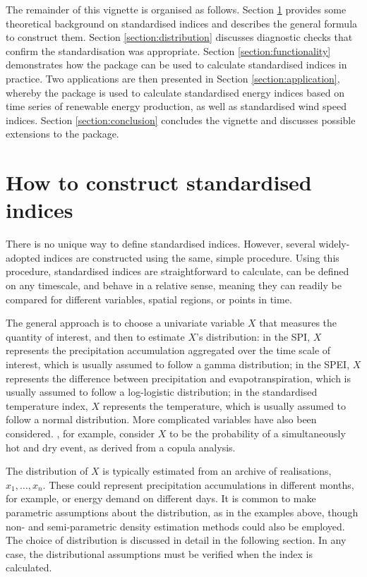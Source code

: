 \documentclass[article,shortnames,nojss]{jss}\usepackage[]{graphicx}\usepackage[]{xcolor}
\begin{document}
The remainder of this vignette is organised as follows. Section \ref{section:theory} provides some theoretical background on standardised indices and describes the general formula to construct them. Section \ref{section:distribution} discusses diagnostic checks that confirm the standardisation was appropriate. Section \ref{section:functionality} demonstrates how the  package can be used to calculate standardised indices in practice. Two applications are then presented in Section \ref{section:application}, whereby the  package is used to calculate standardised energy indices based on time series of renewable energy production, as well as standardised wind speed indices. Section \ref{section:conclusion} concludes the vignette and discusses possible extensions to the package.


\section{How to construct standardised indices}\label{section:theory}

There is no unique way to define standardised indices. However, several widely-adopted indices are constructed using the same, simple procedure. Using this procedure, standardised indices are straightforward to calculate, can be defined on any timescale, and behave in a relative sense, meaning they can readily be compared for different variables, spatial regions, or points in time.

The general approach is to choose a univariate variable $X$ that measures the quantity of interest, and then to estimate $X$'s distribution: in the SPI, $X$ represents the precipitation accumulation aggregated over the time scale of interest, which is usually assumed to follow a gamma distribution; in the SPEI, $X$ represents the difference between precipitation and evapotranspiration, which is usually assumed to follow a log-logistic distribution; in the standardised temperature index, $X$ represents the temperature, which is usually assumed to follow a normal distribution. More complicated variables have also been considered. \cite{HaoEtAl2019}, for example, consider $X$ to be the probability of a simultaneously hot and dry event, as derived from a copula analysis.

The distribution of $X$ is typically estimated from an archive of realisations, $x_{1}, \dots, x_{n}$. These could represent precipitation accumulations in different months, for example, or energy demand on different days. It is common to make parametric assumptions about the distribution, as in the examples above, though non- and semi-parametric density estimation methods could also be employed. The choice of distribution is discussed in detail in the following section. In any case, the distributional assumptions must be verified when the index is calculated.
\end{document}
